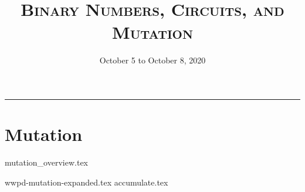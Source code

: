 \documentclass{exam}
\title{\textsc{Binary Numbers, Circuits, and Mutation}}
\date{October 5 to October 8, 2020}
\begin{document}
\maketitle
\rule{\textwidth}{0.15em}
\fontsize{12}{15}\selectfont

\section{Mutation}
{mutation_overview.tex}
\begin{questions}
{wwpd-mutation-expanded.tex}
\newpage
\newpage
{accumulate.tex}
\end{questions}
\end{document}
